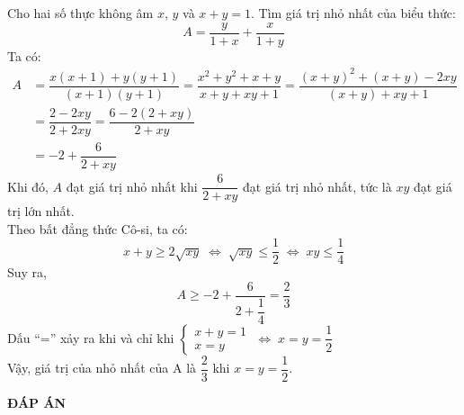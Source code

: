 \begin{ex}%
	Cho hai số thực không âm $x$, $y$ và $x+y=1$. Tìm giá trị nhỏ nhất của biểu thức:
	$$A=\dfrac{y}{1+x}+\dfrac{x}{1+y}$$
	\loigiai
	{
	Ta có:
\begin{align*}
A&=\dfrac{x(x+1)+y(y+1)}{(x+1)(y+1)}=\dfrac{x^2+y^2+x+y}{x+y+xy+1}=\dfrac{(x+y)^2+(x+y)-2xy}{(x+y)+xy+1}\\
&=\dfrac{2-2xy}{2+2xy}=\dfrac{6-2(2+xy)}{2+xy}\\
&=-2+\dfrac{6}{2+xy}
\end{align*}	
	Khi đó, $A$ đạt giá trị nhỏ nhất khi $\dfrac{6}{2+xy}$ đạt giá trị nhỏ nhất, tức là $xy$ đạt giá trị lớn nhất.\\
	Theo bất đẳng thức Cô-si, ta có:
	$$x+y\geq 2\sqrt{xy} \; \Leftrightarrow \; \sqrt{xy}\leq \dfrac{1}{2} \; \Leftrightarrow \; xy\leq\dfrac{1}{4}$$
	Suy ra, $$A\geq -2+\dfrac{6}{2+\dfrac{1}{4}}=\dfrac{2}{3}$$
	Dấu ``='' xảy ra khi và chỉ khi 
	$\left\{\begin{array}{l}
	x+y=1\\
	x=y
	\end{array}\right. \;\Leftrightarrow \; x=y=\dfrac{1}{2}$\\
	Vậy, giá trị của nhỏ nhất của A là $\dfrac{2}{3}$ khi $x=y=\dfrac{1}{2}$.
	}
\end{ex}

\newpage
\begin{center}
	\textbf{ĐÁP ÁN}
\end{center}
\begin{multicols}{10}
	 
\end{multicols}